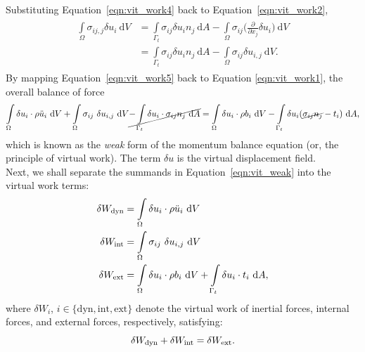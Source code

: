 \documentclass[12pt, a4paper]{article}
\numberwithin{equation}{section}
\begin{document}
Substituting Equation~\ref{eqn:vit_work4} back to Equation~\ref{eqn:vit_work2},
\begin{align}
\begin{split}
\label{eqn:vit_work5}
    \int \limits_\Omega \sigma_{ij, j} \delta u_i \ \mathrm{d}V
    & = \int \limits_{\Gamma_t} \sigma_{ij} \delta u_i n_j \ \mathrm{d}A - \int \limits_\Omega \sigma_{ij} \bigg(\frac{\partial}{\partial x_j} \delta u_i \bigg) \ \mathrm{d}V \\
    & = \int \limits_{\Gamma_t} \sigma_{ij} \delta u_i n_j \ \mathrm{d}A - \int \limits_\Omega \sigma_{ij} \delta u_{i,j} \ \mathrm{d}V .
\end{split}
\end{align}
By mapping Equation~\ref{eqn:vit_work5} back to Equation \ref{eqn:vit_work1}, the overall balance of force
\begin{equation}
\label{eqn:vit_weak}
    \int \limits_\Omega \delta u_i \cdot \rho \ddot{u}_i \ \mathrm{d}V 
    + \int \limits_\Omega \sigma_{ij} \ \delta u_{i, j} \  \mathrm{d}V
    \cancel{- \int \limits_{\Gamma_t} \delta u_i \cdot \sigma_{ij} n_j \ \mathrm{d}A}
    = 
    \int \limits_\Omega \delta u_{i} \cdot \rho b_i\  \mathrm{d}V
    - \int \limits_{\Gamma_t} \delta u_i (\cancel{\sigma_{ij} n_j} - t_i) \ \mathrm{d}A,
\end{equation}
which is known as the \textit{weak} form of the momentum balance equation (or, the principle of virtual work). The term $\delta u$ is the virtual displacement field. \\

Next, we shall separate the summands in Equation~\ref{eqn:vit_weak} into the virtual work terms:
\begin{align}
    \delta W_{\rm dyn} &= \int \limits_\Omega \delta u_i \cdot \rho \ddot{u}_i \ \mathrm{d}V \\
    \delta W_{\rm int} &= \int \limits_\Omega \sigma_{ij} \ \delta u_{i, j} \  \mathrm{d}V \\
    \delta W_{\rm ext} &= \int \limits_\Omega \delta u_{i} \cdot \rho b_i\  \mathrm{d}V + \int \limits_{\Gamma_t} \delta u_i \cdot t_i \ \mathrm{d}A,
\end{align}
where $\delta W_{i}$, $i \in \{\mathrm{dyn}, \mathrm{int}, \mathrm{ext}\}$ denote the virtual work of inertial forces, internal forces, and external forces, respectively, satisfying:
\begin{equation}
    \delta W_{\rm dyn} + \delta W_{\rm int} = \delta W_{\rm ext}.
\end{equation}
\end{document}
